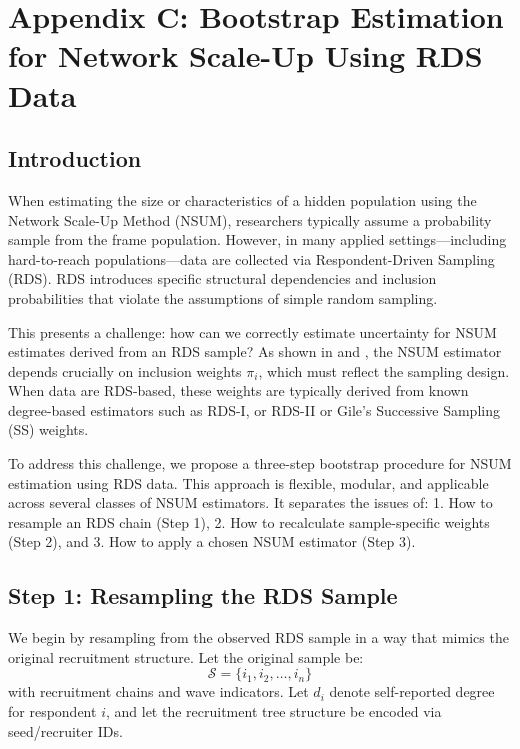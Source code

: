 \documentclass[
  12pt,
  letterpaper,
  DIV=11,
  numbers=noendperiod]{scrartcl}
\theoremstyle{plain}
\theoremstyle{definition}
\begin{document}
\newpage

\section{Appendix C: Bootstrap Estimation for Network Scale-Up Using RDS
Data}\label{sec:3step}

\subsection{Introduction}\label{introduction}

When estimating the size or characteristics of a hidden population using
the Network Scale-Up Method (NSUM), researchers typically assume a
probability sample from the frame population. However, in many applied
settings---including hard-to-reach populations---data are collected via
Respondent-Driven Sampling (RDS). RDS introduces specific structural
dependencies and inclusion probabilities that violate the assumptions of
simple random sampling.

This presents a challenge: how can we correctly estimate uncertainty for
NSUM estimates derived from an RDS sample? As shown in
\textcite{feeh16-generalizing} and \textcite{salg06-variance}, the NSUM
estimator depends crucially on inclusion weights \(\pi_i\), which must
reflect the sampling design. When data are RDS-based, these weights are
typically derived from known degree-based estimators such as RDS-I, or
RDS-II or Gile's Successive Sampling (SS) weights.

To address this challenge, we propose a three-step bootstrap procedure
for NSUM estimation using RDS data. This approach is flexible, modular,
and applicable across several classes of NSUM estimators. It separates
the issues of: 1. How to resample an RDS chain (Step 1), 2. How to
recalculate sample-specific weights (Step 2), and 3. How to apply a
chosen NSUM estimator (Step 3).

\subsection{Step 1: Resampling the RDS
Sample}\label{step-1-resampling-the-rds-sample}

We begin by resampling from the observed RDS sample in a way that mimics
the original recruitment structure. Let the original sample be: \[
\mathcal{S} = \{i_1, i_2, \dots, i_n\}
\] with recruitment chains and wave indicators. Let \(d_i\) denote
self-reported degree for respondent \(i\), and let the recruitment tree
structure be encoded via seed/recruiter IDs.
\end{document}
